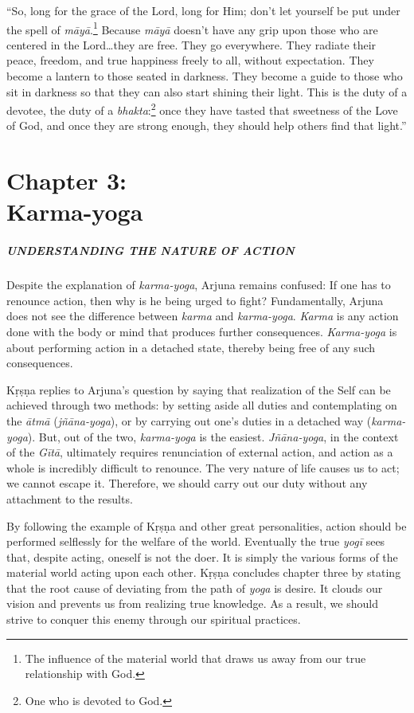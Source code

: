\documentclass[12pt, twoside, openright]{memoir}
\begin{document}
\enquote{So, long for the grace of the Lord, long for Him; don’t let yourself be put under the spell of \textit{māyā}.\footnote{The influence of the material world that draws us away from our true relationship with God.} Because \textit{māyā} doesn’t have any grip upon those who are centered in the Lord\ldots they are free. They go everywhere. They radiate their peace, freedom, and true happiness freely to all, without expectation. They become a lantern to those seated in darkness. They become a guide to those who sit in darkness so that they can also start shining their light. This is the duty of a devotee, the duty of a \textit{bhakta}:\footnote{One who is devoted to God.} once they have tasted that sweetness of the Love of God, and once they are strong enough, they should help others find that light.}
 \chapter{Chapter 3: \\Karma-yoga}\label{chap-karma-yoga}

\paragraph*{\MakeUppercase{Understanding the Nature of Action}}


\noindent Despite the explanation of \textit{karma-yoga}, Arjuna remains confused: If one has to renounce action, then why is he being urged to fight? Fundamentally, Arjuna does not see the difference between \textit{karma} and \textit{karma-yoga}. \textit{Karma} is any action done with the body or mind that produces further consequences. \textit{Karma-yoga} is about performing action in a detached state, thereby being free of any such consequences.

Kṛṣṇa replies to Arjuna’s question by saying that realization of the Self can be achieved through two methods: by setting aside all duties and contemplating on the \textit{ātmā} (\textit{jñāna-yoga}), or by carrying out one’s duties in a detached way (\textit{karma-yoga}). But, out of the two, \textit{karma-yoga} is the easiest. \textit{Jñāna-yoga}, in the context of the \textit{Gītā}, ultimately requires renunciation of external action, and action as a whole is incredibly difficult to renounce. The very nature of life causes us to act; we cannot escape it. Therefore, we should carry out our duty without any attachment to the results.

By following the example of Kṛṣṇa and other great personalities, action should be performed selflessly for the welfare of the world. Eventually the true \textit{yogī} sees that, despite acting, oneself is not the doer. It is simply the various forms of the material world acting upon each other. Kṛṣṇa concludes chapter three by stating that the root cause of deviating from the path of \textit{yoga} is desire. It clouds our vision and prevents us from realizing true knowledge. As a result, we should strive to conquer this enemy through our spiritual practices.
\end{document}
